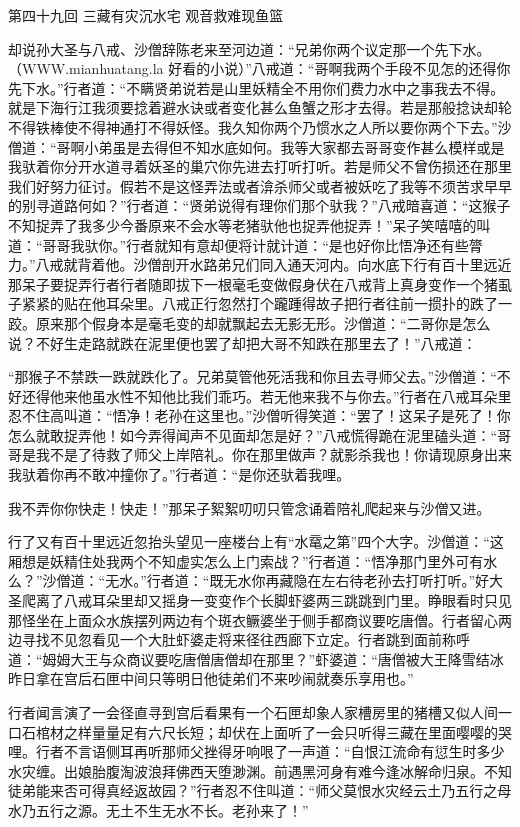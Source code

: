\documentclass[12pt,UTF8]{ctexbook}
\begin{document}
第四十九回 三藏有灾沉水宅 观音救难现鱼篮

却说孙大圣与八戒、沙僧辞陈老来至河边道：“兄弟你两个议定那一个先下水。（WWW.mianhuatang.la 好看的小说）”八戒道：“哥啊我两个手段不见怎的还得你先下水。”行者道：“不瞒贤弟说若是山里妖精全不用你们费力水中之事我去不得。就是下海行江我须要捻着避水诀或者变化甚么鱼蟹之形才去得。若是那般捻诀却轮不得铁棒使不得神通打不得妖怪。我久知你两个乃惯水之人所以要你两个下去。”沙僧道：“哥啊小弟虽是去得但不知水底如何。我等大家都去哥哥变作甚么模样或是我驮着你分开水道寻着妖圣的巢穴你先进去打听打听。若是师父不曾伤损还在那里我们好努力征讨。假若不是这怪弄法或者渰杀师父或者被妖吃了我等不须苦求早早的别寻道路何如？”行者道：“贤弟说得有理你们那个驮我？”八戒暗喜道：“这猴子不知捉弄了我多少今番原来不会水等老猪驮他也捉弄他捉弄！”呆子笑嘻嘻的叫道：“哥哥我驮你。”行者就知有意却便将计就计道：“是也好你比悟净还有些膂力。”八戒就背着他。沙僧剖开水路弟兄们同入通天河内。向水底下行有百十里远近那呆子要捉弄行者行者随即拔下一根毫毛变做假身伏在八戒背上真身变作一个猪虱子紧紧的贴在他耳朵里。八戒正行忽然打个躘踵得故子把行者往前一掼扑的跌了一跤。原来那个假身本是毫毛变的却就飘起去无影无形。沙僧道：“二哥你是怎么说？不好生走路就跌在泥里便也罢了却把大哥不知跌在那里去了！”八戒道：

“那猴子不禁跌一跌就跌化了。兄弟莫管他死活我和你且去寻师父去。”沙僧道：“不好还得他来他虽水性不知他比我们乖巧。若无他来我不与你去。”行者在八戒耳朵里忍不住高叫道：“悟净！老孙在这里也。”沙僧听得笑道：“罢了！这呆子是死了！你怎么就敢捉弄他！如今弄得闻声不见面却怎是好？”八戒慌得跪在泥里磕头道：“哥哥是我不是了待救了师父上岸陪礼。你在那里做声？就影杀我也！你请现原身出来我驮着你再不敢冲撞你了。”行者道：“是你还驮着我哩。

我不弄你你快走！快走！”那呆子絮絮叨叨只管念诵着陪礼爬起来与沙僧又进。

行了又有百十里远近忽抬头望见一座楼台上有“水鼋之第”四个大字。沙僧道：“这厢想是妖精住处我两个不知虚实怎么上门索战？”行者道：“悟净那门里外可有水么？”沙僧道：“无水。”行者道：“既无水你再藏隐在左右待老孙去打听打听。”好大圣爬离了八戒耳朵里却又摇身一变变作个长脚虾婆两三跳跳到门里。睁眼看时只见那怪坐在上面众水族摆列两边有个斑衣鳜婆坐于侧手都商议要吃唐僧。行者留心两边寻找不见忽看见一个大肚虾婆走将来径往西廊下立定。行者跳到面前称呼道：“姆姆大王与众商议要吃唐僧唐僧却在那里？”虾婆道：“唐僧被大王降雪结冰昨日拿在宫后石匣中间只等明日他徒弟们不来吵闹就奏乐享用也。”

行者闻言演了一会径直寻到宫后看果有一个石匣却象人家槽房里的猪槽又似人间一口石棺材之样量量足有六尺长短；却伏在上面听了一会只听得三藏在里面嘤嘤的哭哩。行者不言语侧耳再听那师父挫得牙响哏了一声道：“自恨江流命有愆生时多少水灾缠。出娘胎腹淘波浪拜佛西天堕渺渊。前遇黑河身有难今逢冰解命归泉。不知徒弟能来否可得真经返故园？”行者忍不住叫道：“师父莫恨水灾经云土乃五行之母水乃五行之源。无土不生无水不长。老孙来了！”
\end{document}
